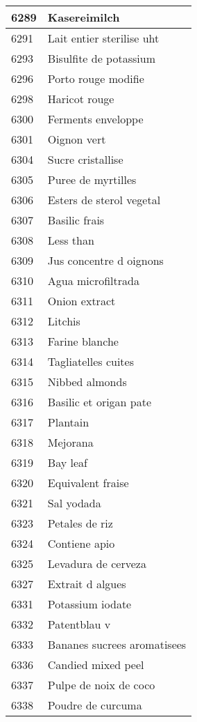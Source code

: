 \begin{longtable}{|l|l|}
6289 & Kasereimilch \\ \hline 
6291 & Lait entier sterilise uht \\ \hline 
6293 & Bisulfite de potassium \\ \hline 
6296 & Porto rouge modifie \\ \hline 
6298 & Haricot rouge \\ \hline 
6300 & Ferments enveloppe \\ \hline 
6301 & Oignon vert \\ \hline 
6304 & Sucre cristallise \\ \hline 
6305 & Puree de myrtilles \\ \hline 
6306 & Esters de sterol vegetal \\ \hline 
6307 & Basilic frais \\ \hline 
6308 & Less than \\ \hline 
6309 & Jus concentre d oignons \\ \hline 
6310 & Agua microfiltrada \\ \hline 
6311 & Onion extract \\ \hline 
6312 & Litchis \\ \hline 
6313 & Farine blanche \\ \hline 
6314 & Tagliatelles cuites \\ \hline 
6315 & Nibbed almonds \\ \hline 
6316 & Basilic et origan pate \\ \hline 
6317 & Plantain \\ \hline 
6318 & Mejorana \\ \hline 
6319 & Bay leaf \\ \hline 
6320 & Equivalent fraise \\ \hline 
6321 & Sal yodada \\ \hline 
6323 & Petales de riz \\ \hline 
6324 & Contiene apio \\ \hline 
6325 & Levadura de cerveza \\ \hline 
6327 & Extrait d algues \\ \hline 
6331 & Potassium iodate \\ \hline 
6332 & Patentblau v \\ \hline 
6333 & Bananes sucrees aromatisees \\ \hline 
6336 & Candied mixed peel \\ \hline 
6337 & Pulpe de noix de coco \\ \hline 
6338 & Poudre de curcuma \\ \hline 

\end{longtable}

